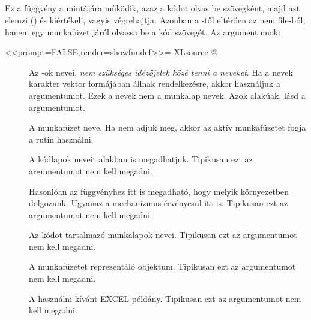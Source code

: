 \subsection{}

Ez a függvény a  mintájára működik, azaz a kódot olvas be
szövegként, majd azt elemzi () és kiértékeli, vagyis
végrehajtja. Azonban a -től eltérően az  
nem file-ból, hanem egy  munkafüzet járól olvassa
be a kód szövegét. Az argumentumok:
\begin{Rnw}
<<prompt=FALSE,render=showfundef>>=
XLsource
@
\end{Rnw}
\begin{description}
\item[] Az -ok nevei, {\em nem szükséges
  idézőjelek közé tenni a neveket}. Ha a nevek karakter vektor
  formájában állnak rendelkezésre, akkor használjuk a 
  argumentumot. Ezek a nevek nem a munkalap nevek. Azok 
   alakúak, lásd a  argumentumot.
\item[] A munkafüzet neve. Ha nem adjuk meg, akkor az
  aktív munkafüzetet fogja a rutin használni.
\item[] A kódlapok neveit 
  alakban is megadhatjuk. Tipikusan ezt az argumentumot nem kell megadni.
\item[] Hasonlóan az  függvényhez itt is
  megadható, hogy melyik környezetben dolgozunk. Ugyanaz a mechanizmus
  érvényesül itt is. Tipikusan ezt az argumentumot nem kell megadni.
\item[] Az  kódot tartalmazó munkalapok nevei. Tipikusan
  ezt az argumentumot nem kell megadni.
\item[] A munkafüzetet reprezentáló 
  objektum. Tipikusan ezt az argumentumot nem kell megadni.
\item[] A használni kívánt EXCEL példány. Tipikusan ezt az argumentumot nem kell megadni.
\end{description}

